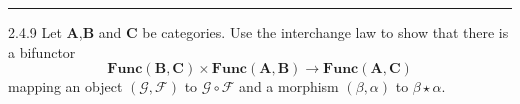 \documentclass[a4paper, 12pt]{article}
\begin{document}
\noindent\rule{7in}{2.8pt}
\begin{problem}{2.4.9}
Let \(\mathbf{A}\),\(\mathbf{B}\) and \(\mathbf{C}\) be categories. Use the interchange law to show that there is a bifunctor 
$$\textbf{Func}(\mathbf{B},\mathbf{C})\times \textbf{Func}(\mathbf{A},\mathbf{B})\rightarrow \textbf{Func}(\mathbf{A},\mathbf{C})$$
mapping an object \((\mathcal{G},\mathcal{F})\) to \(\mathcal{G}\circ \mathcal{F}\) and a morphism \((\beta,\alpha)\) to \(\beta\star \alpha\).

\end{problem}
\end{document}
